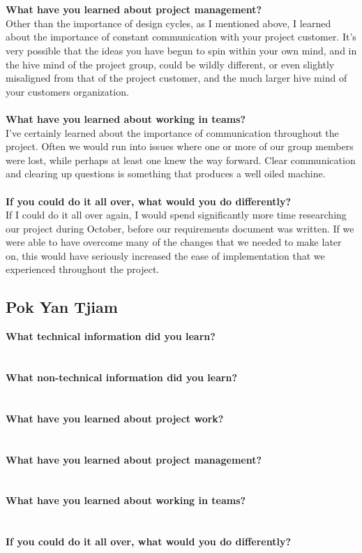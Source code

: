 \documentclass[12pt]{article}
\begin{document}
\\\\
\textbf{What have you learned about project management?}\\
Other than the importance of design cycles, as I mentioned above, I learned about the importance of constant communication with your project customer. It's very possible that the ideas you have begun to spin within your own mind, and in the hive mind of the project group, could be wildly different, or even slightly misaligned from that of the project customer, and the much larger hive mind of your customers organization. 
\\\\
\textbf{What have you learned about working in teams?}\\
I've certainly learned about the importance of communication throughout the project. Often we would run into issues where one or more of our group members were lost, while perhaps at least one knew the way forward. Clear communication and clearing up questions is something that produces a well oiled machine.
\\\\
\textbf{If you could do it all over, what would you do differently?}\\
If I could do it all over again, I would spend significantly more time researching our project during October, before our requirements document was written. If we were able to have overcome many of the changes that we needed to make later on, this would have seriously increased the ease of implementation that we experienced throughout the project.
\\
\pagebreak
\subsection{Pok Yan Tjiam}
\textbf{What technical information did you learn?}\\
\\\\
\textbf{What non-technical information did you learn?}\\
\\\\
\textbf{What have you learned about project work?}\\
\\\\
\textbf{What have you learned about project management?}\\
\\\\
\textbf{What have you learned about working in teams?}\\
\\\\
\textbf{If you could do it all over, what would you do differently?}\\
\\
\pagebreak
\end{document}
